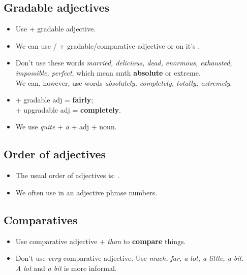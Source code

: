 \subsection{Gradable adjectives}
\begin{itemize}
    \item Use  + gradable adjective.
    \item We can use  /  + gradable/comparative adjective or on it's .
    \item[\doot] Don't use these words 
    \textit{married, delicious, dead, enormous, exhausted, impossible, perfect},%
    which mean smth \textbf{absolute} or extreme.
    \\We can, however, use words  \textit{absolutely, completely, totally, extremely}.
    \item[\doot]  + gradable adj = \textbf{fairly};\\
     + upgradable adj = \textbf{completely}.
    \item[\aast] We use \textit{quite} + \textit{a} + adj + noun.
\end{itemize}

\subsection{Order of adjectives}
\begin{itemize}
    \item The usual order of adjectives is: .
    \item We often use  in an adjective phrase  numbers.
\end{itemize}

\subsection{Comparatives}
\begin{itemize}
    \item Use comparative adjective + \textit{than} to \textbf{compare} things.
    \item Don't use \textit{very}  comparative adjective.
    Use \textit{much, far, a lot, a little, a bit}.\\
    \textit{A lot} and \textit{a bit} is more informal.
\end{itemize}

